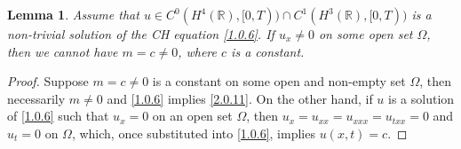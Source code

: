 \documentclass[10pt,a4paper]{amsart}
\newtheorem{lemma}{Lemma}
\begin{document}
\begin{lemma}\label{lema3.1}
    Assume that $u\in C^{0}(H^{4}(\mathbb{R}),[0,T))\cap C^{1}(H^{3}(\mathbb{R}),[0,T))$ is a non-trivial solution of the CH equation \eqref{1.0.6}. If $u_x\neq 0$ on some open set $\Omega$, then we cannot have $m=c\neq 0$, where $c$ is a constant.
\end{lemma}

\begin{proof}
    Suppose $m=c\neq 0$ is a constant on some open and non-empty set $\Omega$, then necessarily $m\neq 0$ and \eqref{1.0.6} implies \eqref{2.0.11}. On the other hand, if $u$ is a solution of \eqref{1.0.6} such that $u_x=0$ on an open set $\Omega$, then $u_x=u_{xx}=u_{xxx}=u_{txx}=0$ and $u_t=0$ on $\Omega$, which, once substituted into \eqref{1.0.6}, implies $u(x,t)=c$.
\end{proof}
\end{document}

